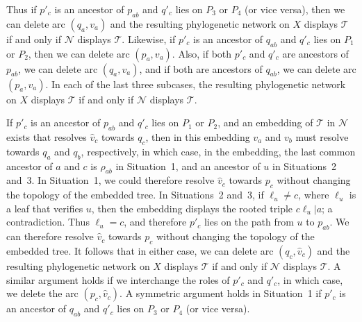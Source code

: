 \documentclass[11pt]{amsart}
\begin{document}
Thus if $p'_c$ is an ancestor of $p_{ab}$ and $q'_c$ lies on $P_3$ or $P_4$ (or vice versa), then we can delete arc $(q_a, v_a)$ and the resulting phylogenetic network on $X$ displays ${{\mathcal T}}$ if and only if ${{\mathcal N}}$ displays ${{\mathcal T}}$. Likewise, if $p'_c$ is an ancestor of $q_{ab}$ and $q'_c$ lies on $P_1$ or $P_2$, then we can delete  arc $(p_a, v_a)$. Also, if both $p'_c$ and $q'_c$ are ancestors of $p_{ab}$, we can delete arc $(q_a,v_a)$, and if both are ancestors of $q_{ab}$, we can delete arc $(p_a,v_a)$. In each of the last three subcases, the resulting phylogenetic network on $X$ displays ${{\mathcal T}}$ if and only if ${{\mathcal N}}$ displays ${{\mathcal T}}$.

If $p'_c$ is an ancestor of $p_{ab}$ and $q'_c$ lies on $P_1$ or $P_2$, and an embedding of ${{\mathcal T}}$ in ${{\mathcal N}}$ exists that resolves $\hat v_c$ towards $q_c$, then in this embedding $v_a$ and $v_b$ must resolve towards $q_a$ and $q_b$, respectively, in which case, in the embedding, the last common ancestor of $a$ and $c$ is $\rho_{ab}$ in Situation~1, and an ancestor of $u$ in Situations~2 and~3. In Situation~1, we could therefore resolve $\hat v_c$ towards $p_c$ without changing the topology of the embedded tree. In Situations~2 and~3, if $\ell_u\neq c$, where $\ell_u$ is a leaf that verifies $u$, then the embedding displays the rooted triple $c\ell_u|a$; a contradiction. Thus $\ell_u=c$, and therefore $p'_c$ lies on the path from $u$ to $p_{ab}$. We can therefore resolve $\hat v_c$ towards $p_c$ without changing the topology of the embedded tree. It follows that in either case, we can delete arc $(q_c, \hat v_c)$ and the resulting phylogenetic network on $X$ displays ${{\mathcal T}}$ if and only if ${{\mathcal N}}$ displays ${{\mathcal T}}$. A similar argument holds if we interchange the roles of $p'_c$ and $q'_c$, in which case, we delete the arc $(p_c, \hat{v}_c)$. A symmetric argument holds in Situation~1 if $p'_c$ is an ancestor of $q_{ab}$ and $q'_c$ lies on $P_3$ or $P_4$ (or vice versa).
\end{document}
